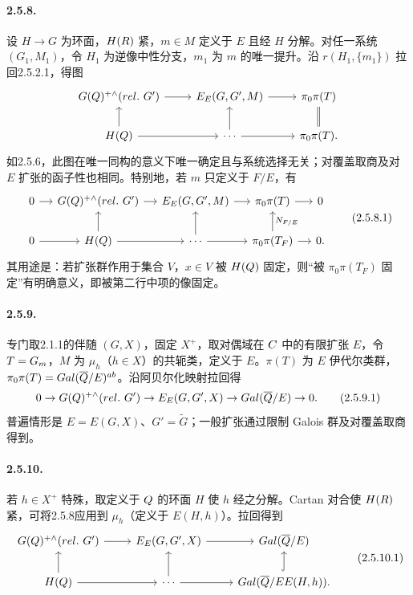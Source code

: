\paragraph*{2.5.8.} 设 $H\to G$ 为环面，$H(R)$ 紧，$m\in M$ 定义于 $E$ 且经 $H$ 分解。对任一系统 $(G_1,M_1)$，令 $H_1$ 为逆像中性分支，$m_1$ 为 $m$ 的唯一提升。沿 $r(H_1,\{m_1\})$ 拉回2.5.2.1，得图
\[
 \begin{tikzcd}
 G(\Q)^{+\wedge}(\mathrm{rel.}\ G')\arrow[r]&\mathcal E_E(G,G',M)\arrow[r]&\pi_0\pi(T)\\
 H(\Q)\arrow[r]\arrow[u]&\cdots\arrow[r]\arrow[u]&\pi_0\pi(T)\arrow[u,equal].
 \end{tikzcd}
\]
如2.5.6，此图在唯一同构的意义下唯一确定且与系统选择无关；对覆盖取商及对 $E$ 扩张的函子性也相同。特别地，若 $m$ 只定义于 $F/E$，有
\begin{equation}
 \begin{tikzcd}[column sep=small]
 0\arrow[r]&G(\Q)^{+\wedge}(\mathrm{rel.}\ G')\arrow[r]&\mathcal E_E(G,G',M)\arrow[r]&\pi_0\pi(T)\arrow[r]&0\\
 0\arrow[r]&H(\Q)\arrow[r]\arrow[u]&\cdots\arrow[r]\arrow[u]&\pi_0\pi(T_F)\arrow[r]\arrow[u,"N_{F/E}"']&0.
 \end{tikzcd}
 \tag{2.5.8.1}
\end{equation}
其用途是：若扩张群作用于集合 $V$，$x\in V$ 被 $H(Q)$ 固定，则“被 $\pi_0\pi(T_F)$ 固定”有明确意义，即被第二行中项的像固定。
\paragraph*{2.5.9.} 专门取2.1.1的伴随 $(G,X)$，固定 $X^+$，取对偶域在 $C$ 中的有限扩张 $E$，令 $T=G_{m}$，$M$ 为 $\mu_h$（$h\in X$）的共轭类，定义于 $E$。$\pi(T)$ 为 $E$ 伊代尔类群，$\pi_0\pi(T)=Gal(\overline{Q}/E)^{ab}$。沿阿贝尔化映射拉回得
\begin{equation}
 0\to G(\Q)^{+\wedge}(\mathrm{rel.}\ G')\to\mathcal E_E(G,G',X)
 \to\Gal(\overline\Q/E)\to0.
 \tag{2.5.9.1}
\end{equation}
普遍情形是 $E=E(G,X)$、$G'=\widetilde G$；一般扩张通过限制 Galois 群及对覆盖取商得到。
\paragraph*{2.5.10.} 若 $h\in X^+$ 特殊，取定义于 $Q$ 的环面 $H$ 使 $h$ 经之分解。Cartan 对合使 $H(R)$ 紧，可将2.5.8应用到 $\mu_h$（定义于 $E(H,h)$）。拉回得到
\begin{equation}
 \begin{tikzcd}
 G(\Q)^{+\wedge}(\mathrm{rel.}\ G')\arrow[r]&\mathcal E_E(G,G',X)\arrow[r]&\Gal(\overline\Q/E)\\
 H(\Q)\arrow[r]\arrow[u]&\cdots\arrow[r]\arrow[u]&\Gal(\overline\Q/EE(H,h))\arrow[u,hook].
 \end{tikzcd}
 \tag{2.5.10.1}
\end{equation}

